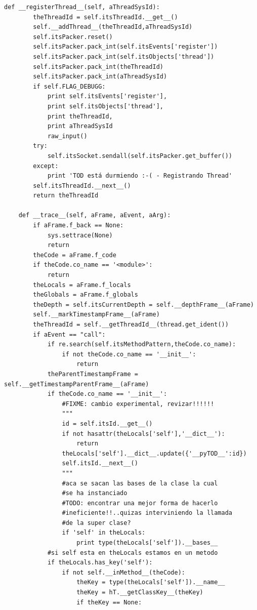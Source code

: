 \documentclass[12pt,legalpaper]{report}
\begin{document}
\begin{singlespace}
\begin{lstlisting}[style=Python]
    def __registerThread__(self, aThreadSysId):
        theThreadId = self.itsThreadId.__get__()
        self.__addThread__(theThreadId,aThreadSysId)
        self.itsPacker.reset()
        self.itsPacker.pack_int(self.itsEvents['register'])
        self.itsPacker.pack_int(self.itsObjects['thread'])
        self.itsPacker.pack_int(theThreadId)
        self.itsPacker.pack_int(aThreadSysId)
        if self.FLAG_DEBUGG:
            print self.itsEvents['register'],
            print self.itsObjects['thread'],
            print theThreadId,
            print aThreadSysId
            raw_input()
        try:
            self.itsSocket.sendall(self.itsPacker.get_buffer())
        except:
            print 'TOD está durmiendo :-( - Registrando Thread'
        self.itsThreadId.__next__()
        return theThreadId

    def __trace__(self, aFrame, aEvent, aArg):
        if aFrame.f_back == None:
            sys.settrace(None)
            return
        theCode = aFrame.f_code
        if theCode.co_name == '<module>':
            return
        theLocals = aFrame.f_locals
        theGlobals = aFrame.f_globals
        theDepth = self.itsCurrentDepth = self.__depthFrame__(aFrame)
        self.__markTimestampFrame__(aFrame)
        theThreadId = self.__getThreadId__(thread.get_ident())
        if aEvent == "call":
            if re.search(self.itsMethodPattern,theCode.co_name):
                if not theCode.co_name == '__init__':
                    return
            theParentTimestampFrame = self.__getTimestampParentFrame__(aFrame)
            if theCode.co_name == '__init__':
                #FIXME: cambio experimental, revizar!!!!!!
                """
                id = self.itsId.__get__()
                if not hasattr(theLocals['self'],'__dict__'):
                    return
                theLocals['self'].__dict__.update({'__pyTOD__':id})
                self.itsId.__next__()
                """
                #aca se sacan las bases de la clase la cual
                #se ha instanciado
                #TODO: encontrar una mejor forma de hacerlo
                #ineficiente!!..quizas interviniendo la llamada
                #de la super clase?
                if 'self' in theLocals:
                    print type(theLocals['self']).__bases__
            #si self esta en theLocals estamos en un metodo
            if theLocals.has_key('self'):
                if not self.__inMethod__(theCode):
                    theKey = type(theLocals['self']).__name__
                    theKey = hT.__getClassKey__(theKey)
                    if theKey == None:

\end{lstlisting}
\end{singlespace}
\end{document}
